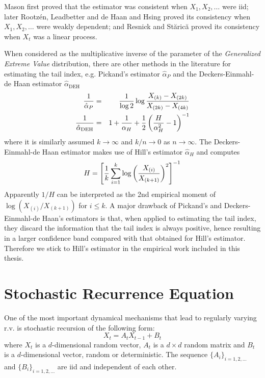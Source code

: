 Mason \cite{mason:1982} first proved that the estimator
was consistent when $X_1, X_2, \dots$ were iid; later Rootz\'en,
Leadbetter and de Haan \cite{rootzen:leadbetter:dehaan1992} and Hsing
\cite{hsing:1991} proved its consistency when $X_1, X_2, \dots$ were
weakly dependent; and Resnick and St{\u a}ric{\u a}
\cite{resnick:starica:1995, resnick:starica:1997} proved its
consistency when $X_t$ was a linear process.

When considered as the multiplicative inverse of the parameter of the
{\em Generalized Extreme Value} distribution, there are other methods
in the literature for estimating the tail index, e.g. Pickand's 
estimator \cite{pickands1975statistical} $\hat \alpha_P$ and the
Deckers-Einmahl-de Haan estimator $\hat \alpha_{\text{DEH}}$
\begin{eqnarray*}
{1 \over \hat \alpha_P}
&=&
{1 \over \log 2}
\log {
  X_{(k)} - X_{(2k)}
  \over
X_{(2k)} - X_{(4k)}  
} \\
{1 \over \hat \alpha_{\text{DEH}}}
&=&
1 + {1 \over \alpha_H} + {1 \over 2} \left(
  {H \over \alpha_H^2} - 1
\right)^{-1}
\end{eqnarray*}
where it is similarly assumed $k \to \infty$ and $k/n \to 0$ as $n \to
\infty$. The Deckers-Einmahl-de Haan estimator makes use of Hill's
estimator $\hat \alpha_H$ and computes
\[
H = \left[
  {1 \over k} \sum_{i=1}^k \log \left(
    { X_{(i)} \over X_{(k+1)} }
  \right)^2
\right]^{-1}
\]
Apparently $1/H$ can be interpreted as the 2nd empirical moment of
$\log(X_{(i)}/X_{(k+1)})$ for $i \leq k$.
A major drawback of Pickand's and Deckers-Einmahl-de Haan's estimators
is that, when applied to estimating the tail index, they discard the
information that the tail index is always positive, hence resulting in
a larger confidence band compared with that obtained for Hill's
estimator. Therefore we stick to Hill's estimator in the empirical
work included in this thesis.

\section{Stochastic Recurrence Equation}
One of the most important dynamical mechanisms that lead to regularly
varying r.v. is stochastic recursion of the following form:
\[
X_t = A_t X_{t-1} + B_t
\]
where $X_t$ is a $d$-dimensional random vector, $A_t$ is a $d\times d$
random matrix and $B_t$ is a $d$-dimensional vector, random or
deterministic. The sequence $\{A_i\}_{i=1,2,\dots}$ and
$\{B_i\}_{i=1,2,\dots}$  are iid and independent of each other.

